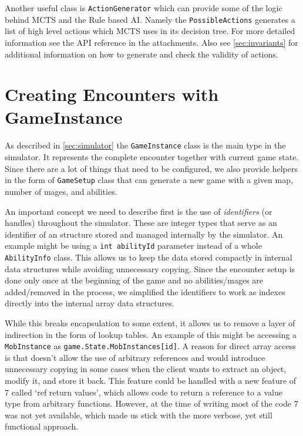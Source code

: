 Another useful class is \verb|ActionGenerator| which can provide some of the logic behind MCTS and the Rule based AI. Namely the \verb|PossibleActions| generates a list of high level actions which MCTS uses in its decision tree. For more detailed information see the API reference in the attachments. Also see \autoref{sec:invariants} for additional information on how to generate and check the validity of actions.

\section{Creating Encounters with GameInstance}

As described in \autoref{sec:simulator} the \verb|GameInstance| class is the main type in the simulator. It represents the complete encounter together with current game state. Since there are a lot of things that need to be configured, we also provide helpers in the form of \verb|GameSetup| class that can generate a new game with a given map, number of mages, and abilities. 

An important concept we need to describe first is the use of \emph{identifiers} (or handles) throughout the simulator. These are integer types that serve as an identifier of an structure stored and managed internally by the simulator. An example might be using a \verb|int abilityId| parameter instead of a whole \verb|AbilityInfo| class. This allows us to keep the data stored compactly in internal data structures while avoiding unnecessary copying. Since the encounter setup is done only once at the beginning of the game and no abilities/mages are added/removed in the process, we simplified the identifiers to work as indexes directly into the internal array data structures.

While this breaks encapsulation to some extent, it allows us to remove a layer of indirection in the form of lookup tables. An example of this might be accessing a \verb|MobInstance| as \verb|game.State.MobInstances[id]|. A reason for direct array access is that \Csh{} doesn't allow the use of arbitrary references and would introduce unnecessary copying in some cases when the client wants to extract an object, modify it, and store it back. This feature could be handled with a new feature of \Csh{} 7 called `ref return values', which allows code to return a reference to a value type from arbitrary functions. However, at the time of writing most of the code \Csh{} 7 was not yet available, which made us stick with the more verbose, yet still functional approach.

